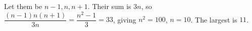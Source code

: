 Let them be $n-1,n,n+1$. Their sum is $3n$, so $\dfrac{(n-1)n(n+1)}{3n}=\dfrac{n^2-1}{3}=33$, giving $n^2=100$, $n=10$. The largest is $\boxed{11}$.
